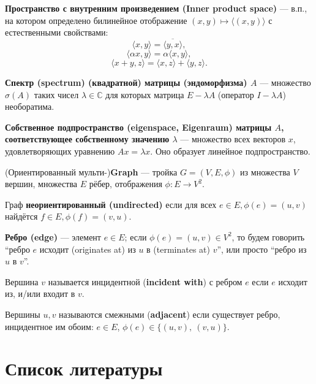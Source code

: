 \documentclass[14pt,a4paper]{extarticle}
\numberwithin{equation}{section}
\theoremstyle{definition}
\begin{document}
\textbf{Пространство с внутренним произведением (Inner product space)} --- в.п.,
на котором определено билинейное отображение \( (x,y) \mapsto \langle (x, y) \rangle\)
с естественными свойствами:
\[ \langle  x, y \rangle = \overline{\langle y, x \rangle}, \]
\[ \langle  \alpha x, y \rangle = \alpha \langle x, y \rangle, \]
\[ \langle  x + y, z \rangle =
  \langle x, z \rangle
  + \langle y, z \rangle.
\]

\textbf{Спектр (spectrum) (квадратной) матрицы (эндоморфизма) \( A \)} ---
множество \( \sigma(A) \) таких чисел \( \lambda\in\mathbb{C} \)
для которых матрица \( E - \lambda A \) (оператор \( I - \lambda A \))
необоратима.

\textbf{Собственное подпространство (eigenspace, Eigenraum)
  матрицы \( A \), соответствующее собственному значению \( \lambda \)}
--- множество всех векторов \( x \), удовлетворяющих уравнению \( Ax = \lambda
x\). Оно образует линейное подпространство.

(Ориентированный мульти-)\textbf{Graph} --- тройка \(G = (V, E, \phi)\)
из множества \( V \) вершин, множества \( E \) рёбер,
отображения \( \phi: E\to V^2\).

Граф \textbf{неориентированный (undirected)} если для всех \( e\in E, \phi(e)=(u, v)\)
найдётся \( f\in E, \phi(f)=(v, u) \).

\textbf{Ребро (edge)} --- элемент \( e\in E \); если \( \phi(e) = (u, v)\in V^2 \),
то будем говорить ``ребро \( e \) исходит (originates at) из \( u \) в
(terminates at) \( v \)'', или просто ``ребро из \( u \) в \( v \)''.

Вершина \( v \) называется инцидентной (\textbf{incident with}) с ребром \( e \)
если \( e \) исходит из, и/или входит в \( v \).

Вершины \( u, v\) называются смежными (\textbf{adjacent})
если существует ребро, инцидентное им обоим: \( e\in E \),
\( \phi(e)\in\{(u, v),\ (v, u) \}\).
\newpage
\section*{Список литературы}
\nocite{*}
\printbibliography[heading=none,env=gostbibliography]
\end{document}
